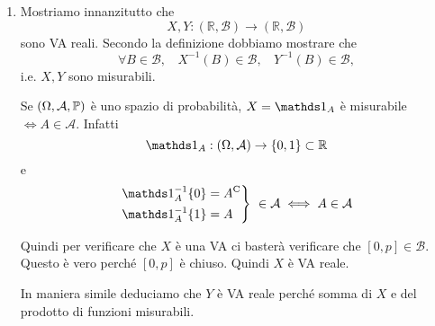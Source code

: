 \ParteSoluzioni

\Soluzione

\begin{enumerate}
\item Mostriamo innanzitutto che
\begin{equation*}
X,Y:(\mathbb{R} ,\mathcal{B})\rightarrow (\mathbb{R} ,\mathcal{B})
\end{equation*}
sono VA reali. Secondo la definizione dobbiamo mostrare che
\begin{equation*}
\forall B\in \mathcal{B} ,\ \ \ \ X^{-1}( B) \in \mathcal{B} ,\ \ \ \ Y^{-1}( B) \in \mathcal{B} ,
\end{equation*}
i.e. $X,Y$ sono misurabili.
\begin{oss}
Se $( \Omega ,\mathcal{A} ,\mathbb{P})$ è uno spazio di probabilità, $X=\Ind_{A}$ è misurabile $\iff A\in \mathcal{A}$. Infatti
\begin{equation*}
\Ind_{A} :( \Omega ,\mathcal{A})\rightarrow \{0,1\} \subset \mathbb{R}
\end{equation*}
e
\begin{equation*}
\begin{drcases}
\Ind_{A}^{-1}\{0\} =A\comp\\
\Ind_{A}^{-1}\{1\} =A
\end{drcases}
\ \in \mathcal{A} \iff A\in \mathcal{A}
\end{equation*}
\end{oss}

Quindi per verificare che $X$ è una VA ci basterà verificare che $[ 0,p] \in \mathcal{B}$. Questo è vero perché $[ 0,p]$ è chiuso. Quindi $X$ è VA reale.

In maniera simile deduciamo che $Y$ è VA reale perché somma di $X$ e del prodotto di funzioni misurabili.


\end{enumerate}
